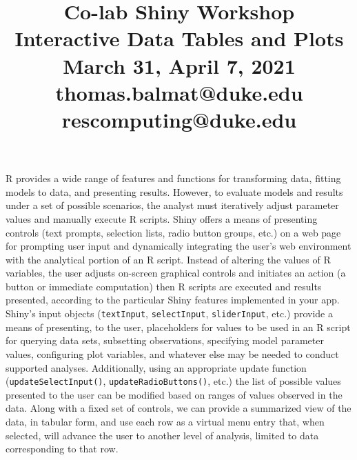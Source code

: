 \documentclass[10pt, letterpaper]{article}
\title{\vspace{-30pt}
       \Large Co-lab Shiny Workshop\\[6pt]
       \large Interactive Data Tables and Plots\\[6pt]
       March 31, April 7, 2021\\[20pt]
       \normalsize thomas.balmat@duke.edu\\[1pt]rescomputing@duke.edu}
\date{}
\begin{document}
    
\begin{spacing}{1.0}
    
\maketitle

\vspace{-30pt}


R provides a wide range of features and functions for transforming data, fitting models to data, and presenting results.  However, to evaluate models and results under a set of possible scenarios, the analyst must iteratively adjust parameter values and manually execute R scripts.  Shiny offers a means of presenting controls (text prompts, selection lists, radio button groups, etc.) on a web page for prompting user input and dynamically integrating the user's web environment with the analytical portion of an R script.  Instead of altering the values of R variables, the user adjusts on-screen graphical controls and initiates an action (a button or immediate computation) then R scripts are executed and results presented, according to the particular Shiny features implemented in your app.\\

Shiny's input objects (\texttt{textInput}, \texttt{selectInput}, \texttt{sliderInput}, etc.) provide a means of presenting, to the user, placeholders for values to be used in an R script for querying data sets, subsetting observations, specifying model parameter values, configuring plot variables, and whatever else may be needed to conduct supported analyses.  Additionally, using an appropriate update function (\texttt{updateSelectInput()}, \texttt{updateRadioButtons()}, etc.) the list of possible values presented to the user can be modified based on ranges of values observed in the data.  Along with a fixed set of controls, we can provide a summarized view of the data, in tabular form, and use each row as a virtual menu entry that, when selected, will advance the user to another level of analysis, limited to data corresponding to that row.\\


\end{spacing}
\end{document}
